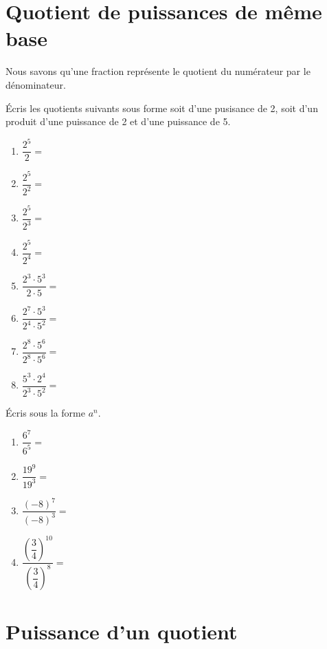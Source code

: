 \documentclass[../math2.tex]{subfiles}
\begin{document}
\pagebreak

\section{Quotient de puissances de même base}
Nous savons qu'une fraction représente le quotient du numérateur par le dénominateur.

Écris les quotients suivants sous forme soit d'une pusisance de 2, soit d'un produit d'une puissance de 2 et d'une puissance de 5.

\begin{enumerate}[itemsep=5em, cols=2]
	\item $\dfrac{2^5}{2}=$
	\item $\dfrac{2^5}{2^2}=$
	\item $\dfrac{2^5}{2^3}=$
	\item $\dfrac{2^5}{2^4}=$
	\item $\dfrac{2^3\cdot 5^3}{2\cdot 5}=$
	\item $\dfrac{2^7\cdot 5^3}{2^4\cdot 5^2}=$
	\item $\dfrac{2^8\cdot 5^6}{2^8\cdot 5^6}=$
	\item $\dfrac{5^3\cdot 2^4}{2^3\cdot 5^2}=$
\end{enumerate}


\begin{center}
\end{center}

\begin{exercise}
	Écris sous la forme $a^n$.
	\begin{enumerate} [cols=2]
		\item $\dfrac{6^7}{6^5}=$
		\item $\dfrac{19^9}{19^3}=$
		\item $\dfrac{(-8)^7}{(-8)^3}=$
		\item $\dfrac{\left(\dfrac{3}{4}\right)^{10}}{\left(\dfrac{3}{4}\right)^8}=$
	\end{enumerate}
\end{exercise}

\pagebreak
\section{Puissance d'un quotient}
\end{document}
